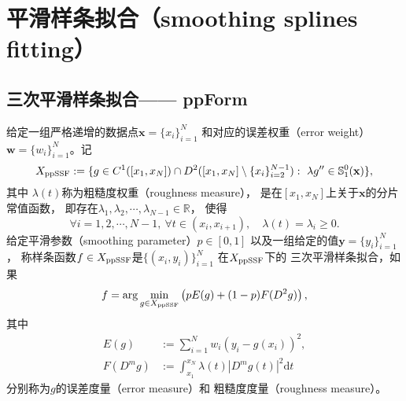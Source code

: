 \cleardoublepage
\section{平滑样条拟合（smoothing splines fitting）}
\label{sec:FINALsmoothingSplineFitting}

\subsection{三次平滑样条拟合—— ppForm }
\label{sec:FINALcubicSmoothingSplineFitting}

\begin{defn}[三次平滑样条拟合]
  \label{def:FINALcubicSmoothingSplinesFitting}
  给定一组严格递增的数据点$\mathbf{x}=\{x_{i}\}_{i=1}^{N}$
  和对应的误差权重（error weight）$\mathbf{w}=\{w_{i}\}_{i=1}^{N}$。记
  \begin{equation}
    \label{eq:FINALSSFppFormSpace}
      X_{\textnormal{ppSSF}}:=
    \{g\in C^{1}([x_{1},x_{N}])\cap
      D^{2}([x_{1},x_{N}]\setminus \{x_{i}\}_{i=2}^{N-1}):
      \ \lambda g''\in \mathbb{S}_{1}^{0}(\mathbf{x})
      \},
  \end{equation}
  其中
  $\lambda(t)$称为粗糙度权重（roughness measure），
  是在$[x_{1},x_{N}]$上关于$\mathbf{x}$的分片常值函数，
  即存在$\lambda_{1},\lambda_{2},\cdots,\lambda_{N-1}\in \mathbb{R}$，
  使得
  \begin{equation}
    \label{eq:FINALlambdat}
    \forall i=1,2,\cdots,N-1,\
    \forall t\in (x_{i},x_{i+1}),\quad
    \lambda(t)= \lambda_{i}\ge 0.
  \end{equation}
  给定平滑参数（smoothing parameter）$p\in [0,1]$
  以及一组给定的值$\mathbf{y}=\{y_{i}\}_{i=1}^{N}$，
  称样条函数$f\in X_{\textnormal{ppSSF}}$是$\{(x_{i},y_{i})\}_{i=1}^{N}$
  在$X_{\textnormal{ppSSF}}$下的
  三次平滑样条拟合，如果
  \begin{equation}
    \label{eq:FINALcubicSmoothingSpline}
    f= \arg\min_{g\in X_{\textnormal{ppSSF}}}\left( pE(g)+(1-p)F(D^{2}g)\right),
  \end{equation}
  其中
  \begin{align}
    \label{eq:FINALerrorMeasure}
    E(g)&:=\sum_{i=1}^{N}w_{i}(y_{i}-g(x_{i}))^{2},\\
    \label{eq:FINALroughnessMeasure}
    F(D^{m}g)&:=\int_{x_{1}}^{x_{N}}
               \lambda(t)|D^{m}g(t)|^{2}\mathrm{d}t
  \end{align}
  分别称为$g$的误差度量（error measure）和
  粗糙度度量（roughness measure）。
\end{defn}

